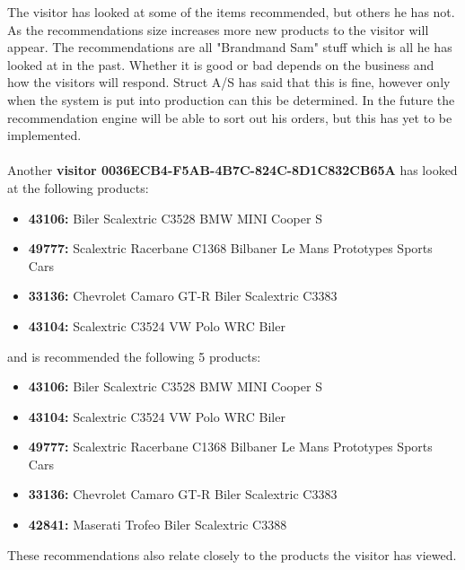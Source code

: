 The visitor has looked at some of the items recommended, but others he has not. As the recommendations size increases more new products to the visitor will appear. The recommendations are all "Brandmand Sam" stuff which is all he has looked at in the past. Whether it is good or bad depends on the business and how the visitors will respond. Struct A/S has said that this is fine, however only when the system is put into production can this be determined. In the future the recommendation engine will be able to sort out his orders, but this has yet to be implemented. \\\\

Another \textbf{visitor 0036ECB4-F5AB-4B7C-824C-8D1C832CB65A} has looked at the following products:
\begin{itemize}
\item \textbf{43106: }Biler Scalextric C3528 BMW MINI Cooper S
\item \textbf{49777: }Scalextric Racerbane C1368 Bilbaner Le Mans Prototypes Sports Cars
\item \textbf{33136: }Chevrolet Camaro GT-R Biler Scalextric C3383 
\item \textbf{43104: }Scalextric C3524 VW Polo WRC Biler
\end{itemize}
and is recommended the following 5 products:
\begin{itemize}
\item \textbf{43106: }Biler Scalextric C3528 BMW MINI Cooper S
\item \textbf{43104: }Scalextric C3524 VW Polo WRC Biler
\item \textbf{49777: }Scalextric Racerbane C1368 Bilbaner Le Mans Prototypes Sports Cars
\item \textbf{33136: }Chevrolet Camaro GT-R Biler Scalextric C3383
\item \textbf{42841: }Maserati Trofeo Biler Scalextric C3388
\end{itemize}

These recommendations also relate closely to the products the visitor has viewed. \\\\

